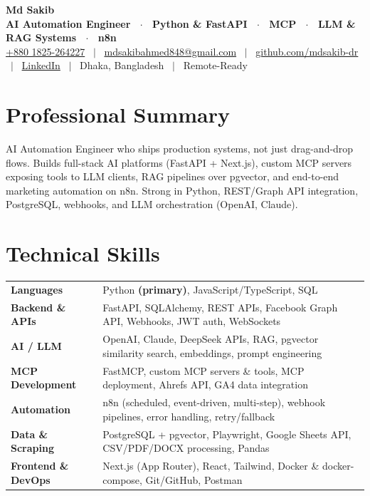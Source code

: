 \documentclass[10pt,a4paper]{article}
\begin{document}
\begin{center}
    {\LARGE \textbf{\color{darktext}Md Sakib}}\\[2pt]
    {\small \textbf{\color{accent}AI Automation Engineer \ $\cdot$ \ Python \& FastAPI \ $\cdot$ \ MCP  \ $\cdot$ \ LLM \& RAG Systems \ $\cdot$ \ n8n }}\\[2.5pt]
    {\small
        \href{tel:+8801825264227}{+880 1825-264227} \ $|$ \
        \href{mailto:mdsakibahmed848@gmail.com}{mdsakibahmed848@gmail.com} \ $|$ \
        \href{https://github.com/mdsakib-dr}{github.com/mdsakib-dr} \ $|$ \
        \href{https://linkedin.com/in/md-sakib-4b7910211/}{LinkedIn} \ $|$ \
        Dhaka, Bangladesh \ $|$ \ Remote-Ready
    }
\end{center}
\vspace{1pt}
\section*{Professional Summary}
{\small
AI Automation Engineer who ships production systems, not just drag-and-drop flows. Builds full-stack AI platforms (FastAPI + Next.js), custom MCP servers exposing tools to LLM clients, RAG pipelines over pgvector, and end-to-end marketing automation on n8n. Strong in Python, REST/Graph API integration, PostgreSQL, webhooks, and LLM orchestration (OpenAI, Claude).
}
\section*{Technical Skills}
\begin{tabular}{@{}p{3.7cm} p{13.9cm}@{}}
\small\textbf{Languages}            & \small Python \textbf{(primary)}, JavaScript/TypeScript, SQL \\[1.5pt]
\small\textbf{Backend \& APIs}      & \small FastAPI, SQLAlchemy, REST APIs, Facebook Graph API, Webhooks, JWT auth, WebSockets \\[1.5pt]
\small\textbf{AI / LLM}             & \small OpenAI, Claude, DeepSeek APIs, RAG, pgvector similarity search, embeddings, prompt engineering \\[1.5pt]
\small\textbf{MCP Development}      & \small FastMCP, custom MCP servers \& tools, MCP deployment, Ahrefs API, GA4 data integration \\[1.5pt]
\small\textbf{Automation}           & \small n8n (scheduled, event-driven, multi-step), webhook pipelines, error handling, retry/fallback \\[1.5pt]
\small\textbf{Data \& Scraping}     & \small PostgreSQL + pgvector, Playwright, Google Sheets API, CSV/PDF/DOCX processing, Pandas \\[1.5pt]
\small\textbf{Frontend \& DevOps}   & \small Next.js (App Router), React, Tailwind, Docker \& docker-compose, Git/GitHub, Postman \\
\end{tabular}
\end{document}

